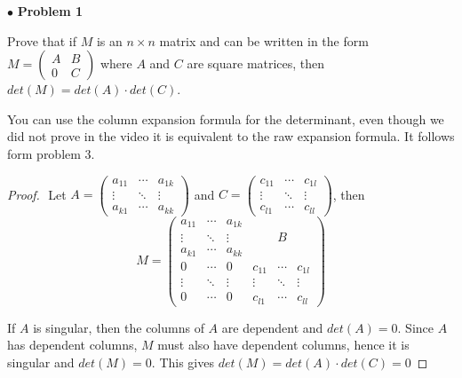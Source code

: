 \documentclass{article}
\begin{document}
$ \bullet$ \textbf{Problem 1}
\medskip

\begin{itshape}
Prove that if $M$ is an $n \times n$ matrix and can be written in the form $M = \begin{pmatrix} A & B \\ 0 & C \end{pmatrix}$ where $A$ and $C$ are square matrices, then $det(M)=det(A) \cdot det(C)$.

You can use the column expansion formula for the determinant, even though we did not prove in the video it is equivalent to the raw expansion formula. It follows form problem 3.
\end{itshape}
\medskip

\begin{proof}
$ $\newline
Let $A= \begin{pmatrix} a_{11} & \cdots & a_{1k} \\ \vdots & \ddots & \vdots \\ a_{k1} & \cdots & a_{kk} \end{pmatrix}$ and $C =\begin{pmatrix} c_{11} & \cdots & c_{1l} \\ \vdots & \ddots & \vdots \\ c_{l1} & \cdots & c_{ll} \end{pmatrix}$, then $$M = \begin{pmatrix} a_{11} & \cdots & a_{1k}   \\ \vdots & \ddots & \vdots & &B&\\ a_{k1} & \cdots & a_{kk} \\ 0 & \cdots & 0 & c_{11} & \cdots & c_{1l}  \\ \vdots & \ddots & \vdots & \vdots & \ddots & \vdots \\ 0 & \cdots & 0 &  c_{l1} & \cdots & c_{ll}  \end{pmatrix}$$
 
If $A$ is singular, then the columns of $A$ are dependent and $det(A) = 0$. Since $A$ has dependent columns, $M$ must also have dependent columns, hence it is singular and $det(M)=0$. This gives $det(M)=det(A) \cdot det(C) = 0$
\medskip


\end{proof}
\end{document}
